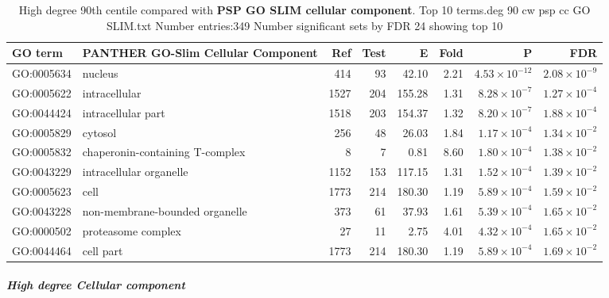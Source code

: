 \begin{table}[ht]
\centering
\begin{adjustbox}{width=\textwidth}
\begin{tabular}{llrrrrrr}
  \hline
GO term & PANTHER GO-Slim Cellular Component & Ref & Test & E & Fold & P & FDR \\ 
  \hline
GO:0005634 & nucleus  & 414 & 93 & 42.10 & 2.21 & $4.53 \times 10^{-12}$ & $2.08 \times 10^{-9}$ \\ 
  GO:0005622 & intracellular  & 1527 & 204 & 155.28 & 1.31 & $8.28 \times 10^{-7}$ & $1.27 \times 10^{-4}$ \\ 
  GO:0044424 & intracellular part  & 1518 & 203 & 154.37 & 1.32 & $8.20 \times 10^{-7}$ & $1.88 \times 10^{-4}$ \\ 
  GO:0005829 & cytosol  & 256 & 48 & 26.03 & 1.84 & $1.17 \times 10^{-4}$ & $1.34 \times 10^{-2}$ \\ 
  GO:0005832 & chaperonin-containing T-complex  & 8 & 7 & 0.81 & 8.60 & $1.80 \times 10^{-4}$ & $1.38 \times 10^{-2}$ \\ 
  GO:0043229 & intracellular organelle  & 1152 & 153 & 117.15 & 1.31 & $1.52 \times 10^{-4}$ & $1.39 \times 10^{-2}$ \\ 
  GO:0005623 & cell  & 1773 & 214 & 180.30 & 1.19 & $5.89 \times 10^{-4}$ & $1.59 \times 10^{-2}$ \\ 
  GO:0043228 & non-membrane-bounded organelle  & 373 & 61 & 37.93 & 1.61 & $5.39 \times 10^{-4}$ & $1.65 \times 10^{-2}$ \\ 
  GO:0000502 & proteasome complex  & 27 & 11 & 2.75 & 4.01 & $4.32 \times 10^{-4}$ & $1.65 \times 10^{-2}$ \\ 
  GO:0044464 & cell part  & 1773 & 214 & 180.30 & 1.19 & $5.89 \times 10^{-4}$ & $1.69 \times 10^{-2}$ \\ 
  \hline
\end{tabular}
\end{adjustbox}
\caption{High degree 90th centile compared with\textbf{ PSP GO SLIM cellular component}. Top 10 terms.deg 90 cw psp cc GO SLIM.txt Number entries:349 Number significant sets by FDR 24 showing top 10} 
\label{tab:deg 90 cw psp cc GO SLIM.txt Number entries:349 Number significant sets by FDR 24 showing top 10}
\end{table}
\subparagraph{High degree Cellular component }

